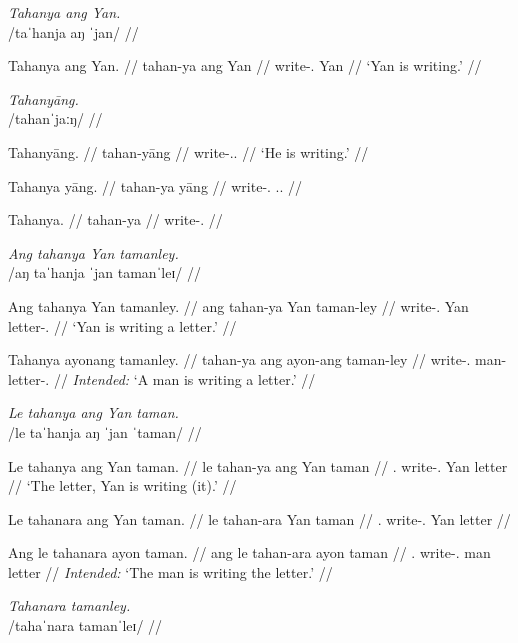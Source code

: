 \documentclass[12pt,a4paper]{scrartcl}
\newcommand{\PargI}{{\Parg}.{\Inan}}
\newcommand{\PatTI}{{\PatT}.{\Inan}}
\newcommand{\TsgM}{{\Tsg}.{\M}}
\newcommand{\TsgI}{{\Tsg}.{\Inan}}
\begin{document}
\ex\begingl
\glpreamble \textit{Tahanya ang Yan.} \\
	/taˈhanja aŋ ˈjan/ //

\gla Tahanya ang Yan. //
\glb tahan-ya ang Yan //
\glc write-\TsgM{} \Aarg{} Yan //
\glft `Yan is writing.' //
\endgl\xe

\pex
\a\begingl
\glpreamble \textit{Tahanyāng.} \\
	/tahanˈjaːŋ/ //

\gla Tahanyāng. //
\glb tahan-yāng //
\glc write-\TsgM{}.\Aarg{} //
\glft `He is writing.' //
\endgl

\a\ljudge*\begingl
\gla Tahanya yāng. //
\glb tahan-ya yāng //
\glc write-\TsgM{} \TsgM{}.\Aarg{} //
\endgl

\a\ljudge*\begingl
\gla Tahanya. //
\glb tahan-ya //
\glc write-\TsgM{} //
\endgl

\xe

\pex
\a\begingl
\glpreamble \textit{Ang tahanya Yan tamanley.} \\
	/aŋ taˈhanja ˈjan tamanˈleɪ/ //

\gla Ang tahanya Yan tamanley. //
\glb ang tahan-ya Yan taman-ley //
\glc \AgtT{} write-\TsgM{} Yan letter-\PargI{} //
\glft `Yan is writing a letter.' //
\endgl

\a\ljudge*\begingl
\gla Tahanya ayonang tamanley. //
\glb tahan-ya ang ayon-ang taman-ley //
\glc write-\TsgM{} man-\Aarg{} letter-\PargI{} //
\glft \textit{Intended:} `A man is writing a letter.' //
\endgl

\xe

\pex
\a\begingl
\glpreamble \textit{Le tahanya ang Yan taman.} \\
	/le taˈhanja aŋ ˈjan ˈtaman/ //

\gla Le tahanya ang Yan taman. //
\glb le tahan-ya ang Yan taman //
\glc \PatTI{} write-\TsgM{} \Aarg{} Yan letter //
\glft `The letter, Yan is writing (it).' //
\endgl

\a\ljudge*\begingl
\gla Le tahanara ang Yan taman. //
\glb le tahan-ara Yan taman //
\glc \PatTI{} write-\TsgI{} \Aarg{} Yan letter //
\endgl

\a\ljudge*\begingl
\gla Ang le tahanara ayon taman. //
\glb ang le tahan-ara ayon taman //
\glc \Aarg{} \PatTI{} write-\TsgI{} man letter //
\glft \textit{Intended:} `The man is writing the letter.' //
\endgl

\xe

\pex
\a\begingl
\glpreamble \textit{Tahanara tamanley.} \\
	/tahaˈnara tamanˈleɪ/ //
\end{document}
